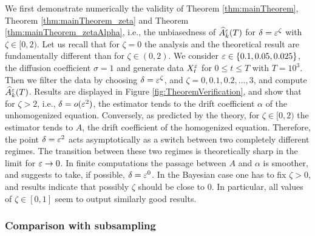 \documentclass[10pt]{article}
\begin{document}
We first demonstrate numerically the validity of Theorem \ref{thm:mainTheorem}, Theorem \ref{thm:mainTheorem_zeta} and Theorem \ref{thm:mainTheorem_zetaAlpha}, i.e., the unbiasedness of $\widehat A^\varepsilon_k(T)$ for $\delta = \varepsilon^\zeta$ with $\zeta \in [0, 2)$. Let us recall that for $\zeta = 0$ the analysis and the theoretical result are fundamentally different than for $\zeta \in (0, 2)$. We consider $\varepsilon \in \{0.1, 0.05, 0.025\}$, the diffusion coefficient $\sigma = 1$ and generate data $X^\varepsilon_t$ for $0 \leq t \leq T$ with $T = 10^3$. Then we filter the data by choosing $\delta = \varepsilon^\zeta$, and $\zeta = 0, 0.1, 0.2,\ldots, 3$, and compute $\widehat A^\varepsilon_k(T)$. Results are displayed in Figure \ref{fig:TheoremVerification}, and show that for $\zeta > 2$, i.e., $\delta = o(\varepsilon^2)$, the estimator tends to the drift coefficient $\alpha$ of the unhomogenized equation. Conversely, as predicted by the theory, for $\zeta \in [0, 2)$ the estimator tends to $A$, the drift coefficient of the homogenized equation. Therefore, the point $\delta = \varepsilon^2$ acts asymptotically as a switch between two completely different regimes. The transition between these two regimes is theoretically sharp in the limit for $\varepsilon \to 0$. In finite computations the passage between $A$ and $\alpha$ is smoother, and suggests to take, if possible, $\delta = \varepsilon^0$. In the Bayesian case one has to fix $\zeta > 0$, and results indicate that possibly $\zeta$ should be close to $0$. In particular, all values of $\zeta \in [0, 1]$ seem to output similarly good results.


\subsubsection{Comparison with subsampling}\label{sec:Num_Param2}
\end{document}
